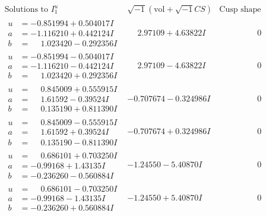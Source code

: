 \documentclass[1p]{elsarticle_modified}
\theoremstyle{definition}
\newcommand{\I}{\sqrt{-1}}
\begin{document}
$$\begin{array}{c|c|c}  
\text{Solutions to }I^u_{1}& \I (\text{vol} + \sqrt{-1}CS) & \text{Cusp shape}\\
 \hline 
\begin{aligned}
u &= -0.851994 + 0.504017 I \\
a &= -1.116210 + 0.442124 I \\
b &= \phantom{-}1.023420 - 0.292356 I\end{aligned}
 & \phantom{-}2.97109 + 4.63822 I & \phantom{-0.000000 } 0 \\ \hline\begin{aligned}
u &= -0.851994 - 0.504017 I \\
a &= -1.116210 - 0.442124 I \\
b &= \phantom{-}1.023420 + 0.292356 I\end{aligned}
 & \phantom{-}2.97109 - 4.63822 I & \phantom{-0.000000 } 0 \\ \hline\begin{aligned}
u &= \phantom{-}0.845009 + 0.555915 I \\
a &= \phantom{-}1.61592 - 0.39524 I \\
b &= \phantom{-}0.135190 + 0.811390 I\end{aligned}
 & -0.707674 - 0.324986 I & \phantom{-0.000000 } 0 \\ \hline\begin{aligned}
u &= \phantom{-}0.845009 - 0.555915 I \\
a &= \phantom{-}1.61592 + 0.39524 I \\
b &= \phantom{-}0.135190 - 0.811390 I\end{aligned}
 & -0.707674 + 0.324986 I & \phantom{-0.000000 } 0 \\ \hline\begin{aligned}
u &= \phantom{-}0.686101 + 0.703250 I \\
a &= -0.99168 + 1.43135 I \\
b &= -0.236260 - 0.560884 I\end{aligned}
 & -1.24550 - 5.40870 I & \phantom{-0.000000 } 0 \\ \hline\begin{aligned}
u &= \phantom{-}0.686101 - 0.703250 I \\
a &= -0.99168 - 1.43135 I \\
b &= -0.236260 + 0.560884 I\end{aligned}
 & -1.24550 + 5.40870 I & \phantom{-0.000000 } 0 \\ \hline\begin{aligned}

\end{aligned}
\end{array}$$
\end{document}
